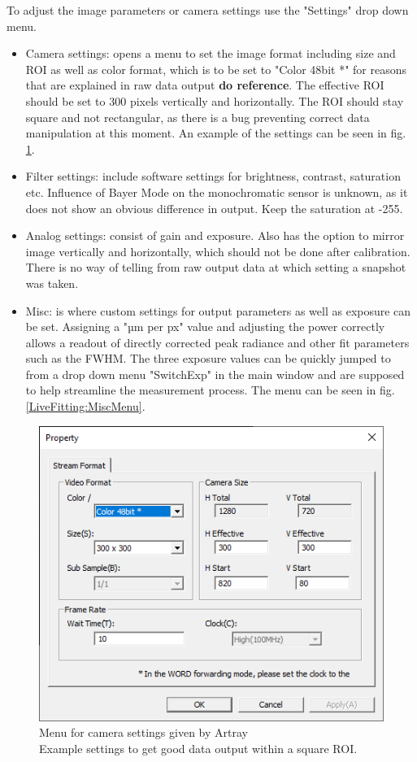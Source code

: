 \documentclass[twoside,openright]{scrreprt}
\begin{document}
To adjust the image parameters or camera settings use the "Settings" drop down menu.
\begin{itemize}
\item Camera settings: opens a menu to set the image format including size and ROI as well as color format, which is to be set to "Color 48bit *" for reasons that are explained in raw data output \textbf{do reference}. The effective ROI should be set to 300 pixels vertically and horizontally. The ROI should stay square and not rectangular, as there is a bug preventing correct data manipulation at this moment. An example of the settings can be seen in fig. \ref{fig:artrayCameraSetting}.
\item Filter settings: include software settings for brightness, contrast, saturation etc. Influence of Bayer Mode on the monochromatic sensor is unknown, as it does not show an obvious difference in output. Keep the saturation at -255.
\item Analog settings: consist of gain and exposure. Also has the option to mirror image vertically and horizontally, which should not be done after calibration. There is no way of telling from raw output data at which setting a snapshot was taken.
\item Misc: is where custom settings for output parameters as well as exposure can be set. Assigning a "µm per px" value and adjusting the power correctly allows a readout  of directly corrected peak radiance and other fit parameters such as the FWHM. The three exposure values can be quickly jumped to from a drop down menu "SwitchExp" in the main window and are supposed to help streamline the measurement process. The menu can be seen in fig. \ref{LiveFitting:MiscMenu}.
\end{itemize}

\begin{figure}[hbtp]
\centering
\includegraphics[width = 0.6\linewidth]{images/ArtrayExamplePics/StreamProperties.PNG}
\caption{Menu for camera settings given by Artray\\ Example settings to get good data output within a square ROI.\label{fig:artrayCameraSetting}}
\end{figure}
\end{document}
